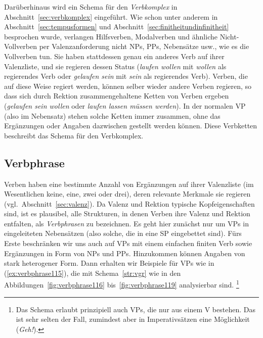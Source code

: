 Darüberhinaus wird ein Schema für den \textit{Verbkomplex} in Abschnitt~\ref{sec:verbkomplex} eingeführt.
Wie schon unter anderem in Abschnitt~\ref{sec:tempusformen} und Abschnitt~\ref{sec:finitheitundinfinitheit} besprochen wurde, verlangen Hilfsverben, Modalverben und ähnliche Nicht-Vollverben per Valenzanforderung nicht NPs, PPs, Nebensätze usw., wie es die Vollverben tun.
Sie haben stattdessen genau ein anderes Verb auf ihrer Valenzliste, und sie regieren dessen Status (\zB \textit{laufen wollen} mit \textit{wollen} als regierendes Verb oder \textit{gelaufen sein} mit \textit{sein} als regierendes Verb).
Verben, die auf diese Weise regiert werden, können selber wieder andere Verben regieren, so dass sich durch Rektion zusammengehaltene Ketten von Verben ergeben (\zB \textit{gelaufen sein wollen} oder \textit{laufen lassen müssen werden}).
In der normalen VP (also im Nebensatz) stehen solche Ketten immer zusammen, ohne das Ergänzungen oder Angaben dazwischen gestellt werden können.
Diese Verbketten beschreibt das Schema für den Verbkomplex.

\subsection{Verbphrase}
\label{sec:verbphrase}


Verben haben eine bestimmte Anzahl von Ergänzungen auf ihrer Valenzliste (im Wesentlichen keine, eine, zwei oder drei), deren relevante Merkmale sie regieren (vgl.\ Abschnitt~\ref{sec:valenz}).
Da Valenz und Rektion typische Kopfeigenschaften sind, ist es plausibel, alle Strukturen, in denen Verben ihre Valenz und Rektion entfalten, als \textit{Verbphrasen} zu bezeichnen.
Es geht hier zunächst nur um VPs in eingeleiteten Nebensätzen (also solche, die in eine SP eingebettet sind).
Fürs Erste beschränken wir uns auch auf VPs mit einem einfachen finiten Verb sowie Ergänzungen in Form von NPs und PPs.
Hinzukommen können Angaben von stark heterogener Form.
Dann erhalten wir Beispiele für VPs wie in (\ref{ex:verbphrase115}), die mit Schema~\ref{str:vgr} wie in den Abbildungen~\ref{fig:verbphrase116} bis~\ref{fig:verbphrase119} analysierbar sind.%
\footnote{Das Schema erlaubt prinzipiell auch VPs, die nur aus einem V bestehen.
Das ist sehr selten der Fall, zumindest aber in Imperativsätzen eine Möglichkeit (\zB \textit{Geh!}).}



